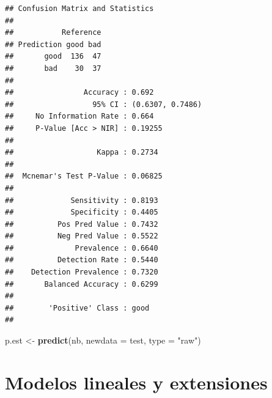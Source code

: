 \documentclass[
  spanish,
]{book}
\newenvironment{Shaded}{\begin{snugshade}}{\end{snugshade}}
\newcommand{\DataTypeTok}[1]{\textcolor[rgb]{0.13,0.29,0.53}{#1}}
\newcommand{\KeywordTok}[1]{\textcolor[rgb]{0.13,0.29,0.53}{\textbf{#1}}}
\newcommand{\NormalTok}[1]{#1}
\newcommand{\OperatorTok}[1]{\textcolor[rgb]{0.81,0.36,0.00}{\textbf{#1}}}
\newcommand{\StringTok}[1]{\textcolor[rgb]{0.31,0.60,0.02}{#1}}
\theoremstyle{break}
\theoremstyle{definition}
\theoremstyle{definition}
\theoremstyle{definition}
\theoremstyle{remark}
\begin{document}
\begin{Shaded}
\end{Shaded}

\begin{verbatim}
## Confusion Matrix and Statistics
## 
##           Reference
## Prediction good bad
##       good  136  47
##       bad    30  37
##                                           
##                Accuracy : 0.692           
##                  95% CI : (0.6307, 0.7486)
##     No Information Rate : 0.664           
##     P-Value [Acc > NIR] : 0.19255         
##                                           
##                   Kappa : 0.2734          
##                                           
##  Mcnemar's Test P-Value : 0.06825         
##                                           
##             Sensitivity : 0.8193          
##             Specificity : 0.4405          
##          Pos Pred Value : 0.7432          
##          Neg Pred Value : 0.5522          
##              Prevalence : 0.6640          
##          Detection Rate : 0.5440          
##    Detection Prevalence : 0.7320          
##       Balanced Accuracy : 0.6299          
##                                           
##        'Positive' Class : good            
## 
\end{verbatim}

\begin{Shaded}
\begin{Highlighting}[]
\NormalTok{p.est <-}\StringTok{ }\KeywordTok{predict}\NormalTok{(nb, }\DataTypeTok{newdata =}\NormalTok{ test, }\DataTypeTok{type =} \StringTok{"raw"}\NormalTok{)}
\end{Highlighting}
\end{Shaded}

\hypertarget{modelos-lineales}{%
\chapter{Modelos lineales y extensiones}\label{modelos-lineales}}
\end{document}

